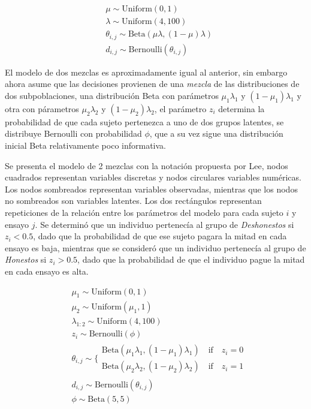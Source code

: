 \documentclass[]{article}
\begin{document}
\[
\begin{aligned}
&\mu \sim \mathrm{Uniform}(0, 1)\\
&\lambda \sim \mathrm{Uniform}(4, 100)\\
&\theta_{i,j} \sim \mathrm{Beta}(\mu\lambda, (1 - \mu)\lambda)\\
&d_{i,j} \sim \mathrm{Bernoulli}(\theta_{i,j}) 
\end{aligned}
\]

El modelo de dos mezclas es aproximadamente igual al anterior, sin
embargo ahora asume que las decisiones provienen de una \emph{mezcla} de
las distribuciones de dos subpoblaciones, una distribución Beta con
parámetros \(\mu_1\lambda_1\) y \((1 - \mu_1) \lambda_1\) y otra con
párametros \(\mu_2\lambda_2\) y \((1 - \mu_2) \lambda_2\), el parámetro
\(z_i\) determina la probabilidad de que cada sujeto pertenezca a uno de
dos grupos latentes, se distribuye Bernoulli con probabilidad \(\phi\),
que a su vez sigue una distribución inicial Beta relativamente poco
informativa.

Se presenta el modelo de 2 mezclas con la notación propuesta por Lee,
nodos cuadrados representan variables discretas y nodos circulares
variables numéricas. Los nodos sombreados representan variables
observadas, mientras que los nodos no sombreados son variables latentes.
Los dos rectángulos representan repeticiones de la relación entre los
parámetros del modelo para cada sujeto \(i\) y ensayo \(j\). Se
determinó que un individuo pertenecía al grupo de \emph{Deshonestos} si
\(z_i < 0.5\), dado que la probabilidad de que ese sujeto pagara la
mitad en cada ensayo es baja, mientras que se consideró que un individuo
pertenecía al grupo de \emph{Honestos} si \(z_i > 0.5\), dado que la
probabilidad de que el individuo pague la mitad en cada ensayo es alta.

\[
\begin{aligned} 
&\mu_1 \sim \mathrm{Uniform}(0, 1)\\
&\mu_2 \sim \mathrm{Uniform}(\mu_1, 1)\\
&\lambda_{1:2} \sim \mathrm{Uniform}(4, 100)\\
&z_i \sim \mathrm{Bernoulli}(\phi)\\
&\theta_{i,j} \sim \Bigg\{
  \begin{array} {lr} 
    \mathrm{Beta}(\mu_1\lambda_1, (1 - \mu_1)\lambda_1) \quad \mbox{if} \quad z_i = 0 \\
    \mathrm{Beta}(\mu_2\lambda_2, (1 - \mu_2)\lambda_2) \quad \mbox{if} \quad z_i = 1
  \end{array} \\
&d_{i,j} \sim \mathrm{Bernoulli}(\theta_{i,j})\\
&\phi \sim \mathrm{Beta}(5, 5)
\end{aligned}
\]
\end{document}
